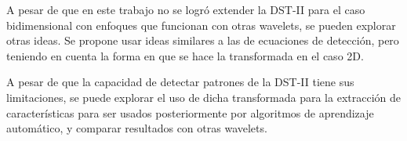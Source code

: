 \begin{recomendations}
	A pesar de que en este trabajo no se logró extender la DST-II para el caso bidimensional con enfoques 
	que funcionan con otras wavelets, se pueden explorar otras ideas.
	Se propone usar ideas similares a las de ecuaciones de detección, pero teniendo
	en cuenta la forma en que se hace la transformada en el caso 2D.

	A pesar de que la capacidad de detectar patrones de la DST-II tiene sus limitaciones, se puede explorar el uso
	de dicha transformada para la extracción de características para ser usados posteriormente por algoritmos
	de aprendizaje automático, y comparar resultados con otras wavelets.
\end{recomendations}

